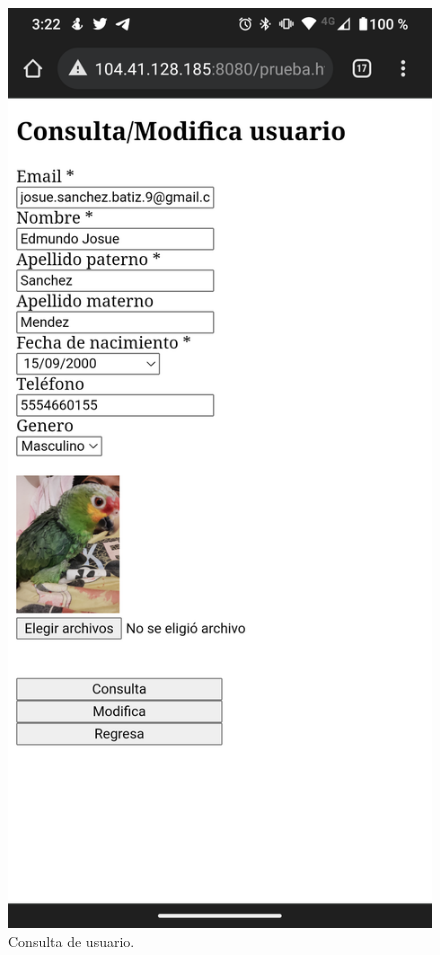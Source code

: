\documentclass[11pt]{article}
\begin{document}
		\begin{figure}[H]
			\centering
			\includegraphics[scale=0.18]{resources/Screenshot_20211024-152206.png}
			\caption{Consulta de usuario.}\label{fig:picture}
		\end{figure}
\end{document}
